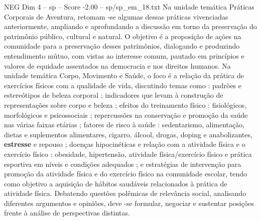 \begin{textsample}{NEG Dim 4 – sp – Score -2.00 – sp/sp\_em\_18.txt}
Na unidade temática Práticas Corporais de Aventura, retomam -se algumas dessas práticas vivenciadas anteriormente, ampliando e aprofundando a discussão em torno da preservação do patrimônio público, cultural e natural.
O objetivo é a proposição de ações na comunidade para a preservação desses patrimônios, dialogando e produzindo entendimento mútuo, com vistas ao interesse comum, pautado em princípios e valores de equidade assentados na democracia e nos direitos humanos.
Na unidade temática Corpo, Movimento e Saúde, o foco é a relação da prática de exercícios físicos com a qualidade de vida, discutindo temas como : padrões e estereótipos de beleza corporal ; indicadores que levam à construção de representações sobre corpo e beleza ; efeitos do treinamento físico : fisiológicos, morfológicos e psicossociais ; repercussões na conservação e promoção da saúde nas várias faixas etárias ; fatores de risco à saúde : sedentarismo, alimentação, dietas e suplementos alimentares, cigarro, álcool, drogas, doping e anabolizantes, \textbf{estresse} e repouso ; doenças hipocinéticas e relação com a atividade física e o exercício físico : obesidade, hipertensão, atividade física/exercício físico e prática esportiva em níveis e condições adequados ; e estratégias de intervenção para promoção da atividade física e do exercício físico na comunidade escolar, tendo como objetivo a aquisição de hábitos saudáveis relacionados à prática de atividade física.
Debatendo questões polêmicas de relevância social, analisando diferentes argumentos e opiniões, deve -se formular, negociar e sustentar posições frente à análise de perspectivas distintas.

\end{textsample}
